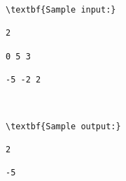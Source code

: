 \begin{verbatim}
\textbf{Sample input:}

2

0 5 3

-5 -2 2



\textbf{Sample output:}

2

-5 

\end{verbatim}